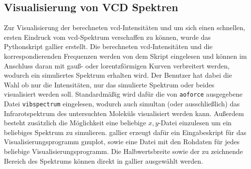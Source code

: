 	\subsection{Visualisierung von VCD Spektren}
	Zur Visualisierung der berechneten \ac{vcd}-Intensitäten und um sich einen schnellen, ersten Eindruck vom \ac{vcd}-Spektrum verschaffen zu können, wurde das Pythonskript \ac{gallier} erstellt. Die berechneten \ac{vcd}-Intensitäten und die korrespondierenden Frequenzen werden von dem Skript eingelesen und können im Anschluss daran mit gauß- oder lorentzförmigen Kurven verbreitert werden, wodurch ein simuliertes Spektrum erhalten wird. Der Benutzer hat dabei die Wahl ob nur die Intensitäten, nur das simulierte Spektrum oder beides visualisiert werden soll. Standardmäßig wird dafür die von \texttt{aoforce} ausgegebene Datei \texttt{vibspectrum} eingelesen, wodurch auch simultan (oder ausschließlich) das Infrarotspektrum des untersuchten Moleküls visualisiert werden kann. Außerdem besteht zusätzlich die Möglichkeit eine beliebige $x,y$-Datei einzulesen um ein beliebiges Spektrum zu simulieren. \ac{gallier} erzeugt dafür ein Eingabeskript für das Visualisierungsprogramm gnuplot\supercite{gnuplot}, sowie eine Datei mit den Rohdaten für jedes beliebige Visualisierungsprogramm. Die Halbwertsbreite sowie der zu zeichnende Bereich des Spektrums können direkt in \ac{gallier} ausgewählt werden.
	
	
